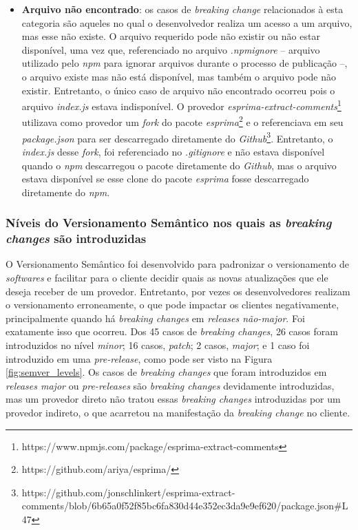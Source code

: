 \begin{itemize}
    \item \textbf{Arquivo não encontrado}: os casos de \textit{breaking change} relacionados à esta categoria são aqueles no qual o desenvolvedor realiza um acesso a um arquivo, mas esse não existe. O arquivo requerido pode não existir ou não estar disponível, uma vez que, referenciado no arquivo \textit{.npmignore} -- arquivo utilizado pelo \textit{npm} para ignorar arquivos durante o processo de publicação --, o arquivo existe mas não está disponível, mas também o arquivo pode não existir. Entretanto, o único caso de arquivo não encontrado ocorreu pois o arquivo \textit{index.js} estava indisponível. O provedor \textit{esprima-extract-comments}\footnote{https://www.npmjs.com/package/esprima-extract-comments} utilizava como provedor um \textit{fork} do pacote \textit{esprima}\footnote{https://github.com/ariya/esprima/} e o referenciava em seu  \textit{package.json} para ser descarregado diretamente do \textit{Github}\footnote{https://github.com/jonschlinkert/esprima-extract-comments/blob/6b65a0f52f85bc6fa830d44e352ec3da9e9ef620/package.json\#L47}. Entretanto, o \textit{index.js} desse \textit{fork}, foi referenciado no \textit{.gitignore} e não estava disponível quando o \textit{npm} descarregou o pacote diretamente do \textit{Github}, mas o arquivo estava disponível se esse clone do pacote \textit{esprima} fosse descarregado diretamente do \textit{npm}.

\end{itemize}{}

\subsubsection{Níveis do Versionamento Semântico nos quais as \textit{breaking changes} são introduzidas}
O Versionamento Semântico foi desenvolvido para padronizar o versionamento de \textit{softwares} e facilitar para o cliente decidir quais as novas atualizações que ele deseja receber de um provedor. Entretanto, por vezes os desenvolvedores realizam o versionamento erroneamente, o que pode impactar os clientes negativamente, principalmente quando há \textit{breaking changes} em \textit{releases não-major}. Foi exatamente isso que ocorreu. Dos 45 casos de \textit{breaking changes}, 26 casos foram introduzidos no nível \textit{minor}; 16 casos, \textit{patch}; 2 casos, \textit{major}; e 1 caso foi introduzido em uma \textit{pre-release}, como pode ser visto na Figura \ref{fig:semver_levels}. Os casos de \textit{breaking changes} que foram introduzidos em \textit{releases major} ou \textit{pre-releases} são \textit{breaking changes} devidamente introduzidas, mas um provedor direto não tratou essas \textit{breaking changes} introduzidas por um provedor indireto, o que acarretou na manifestação da \textit{breaking change} no cliente.

